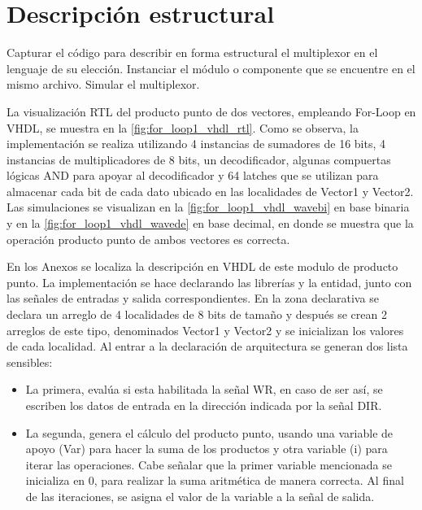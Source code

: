 \section{Descripción estructural \label{sec:s1}}

\begin{center}
	\begin{minipage}{12cm}
		\begin{tcolorbox}[title=Actividad 1]
			Capturar el código para describir en forma estructural el multiplexor en el lenguaje de su elección. Instanciar el módulo o componente que se encuentre en el mismo archivo. Simular el multiplexor.
		\end{tcolorbox}	
	\end{minipage}
\end{center}

La visualización RTL del producto punto de dos vectores, empleando For-Loop en VHDL, se muestra en la \autoref{fig:for_loop1_vhdl_rtl}. Como se observa, la implementación se realiza utilizando 4 instancias de sumadores de 16 bits, 4 instancias de multiplicadores de 8 bits, un decodificador, algunas compuertas lógicas AND para apoyar al decodificador y 64 latches que se utilizan para almacenar cada bit de cada dato ubicado en las localidades de Vector1 y Vector2. Las simulaciones se visualizan en la \autoref{fig:for_loop1_vhdl_wavebi} en base binaria y en la \autoref{fig:for_loop1_vhdl_wavede} en base decimal, en donde se muestra que la operación producto punto de ambos vectores es correcta.

En los Anexos se localiza la descripción en VHDL de este modulo de producto punto. La implementación se hace declarando las librerías y la entidad, junto con las señales de entradas y salida correspondientes. En la zona declarativa se declara un arreglo de 4 localidades de 8 bits de tamaño y después se crean 2 arreglos de este tipo, denominados Vector1 y Vector2 y se inicializan los valores de cada localidad. Al entrar a la declaración de arquitectura se generan dos lista sensibles:

\begin{itemize}
	\item La primera, evalúa si esta habilitada la señal WR, en caso de ser así, se escriben los datos de entrada en la dirección indicada por la señal DIR.
	\item La segunda, genera el cálculo del producto punto, usando una variable de apoyo (Var) para hacer la suma de los productos y otra variable (i) para iterar las operaciones. Cabe señalar que la primer variable mencionada se inicializa en 0, para realizar la suma aritmética de manera correcta. Al final de las iteraciones, se asigna el valor de la variable a la señal de salida.
\end{itemize}

